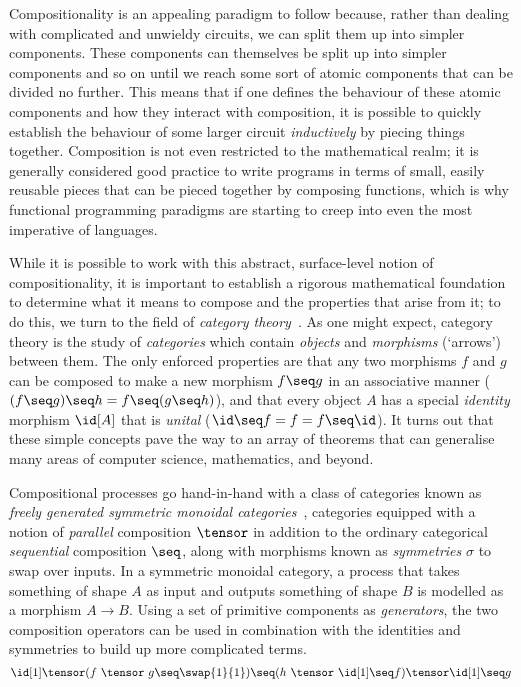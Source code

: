 Compositionality is an appealing paradigm to follow because, rather than dealing
with complicated and unwieldy circuits, we can split them up into simpler
components.
These components can themselves be split up into simpler components and so on
until we reach some sort of atomic components that can be divided no further.
This means that if one defines the behaviour of these atomic components and
how they interact with composition, it is possible to quickly establish the
behaviour of some larger circuit \emph{inductively} by piecing things together.
Composition is not even restricted to the mathematical realm; it is generally
considered good practice to write programs in terms of small, easily reusable
pieces that can be pieced together by composing functions, which is why
functional programming paradigms are starting to creep into even the most
imperative of languages.

While it is possible to work with this abstract, surface-level notion of
compositionality, it is important to establish a rigorous mathematical
foundation to determine what it means to compose and the properties that
arise from it; to do this, we turn to the field of
\emph{category theory}~\cite{maclane1978categories}.
As one might expect, category theory is the study of \emph{categories} which
contain \emph{objects} and \emph{morphisms} (`arrows') between them.
The only enforced properties are that any two morphisms \(f\) and \(g\) can be
composed to make a new morphism \(f \seq g\) in an
associative manner (\((f \seq g) \seq h = f \seq (g \seq h)\)), and that every
object \(A\) has a special \emph{identity} morphism \(\id[A]\) that is
\emph{unital} (\(\id \seq f = f = f \seq \id\)).
It turns out that these simple concepts pave the way to an array of
theorems that can generalise many areas of computer science, mathematics, and
beyond.

Compositional processes go hand-in-hand with a class of categories known as
\emph{freely generated symmetric monoidal categories}~\cite{maclane1963natural},
categories equipped with a notion of \emph{parallel} composition \(\tensor\) in
addition to the ordinary categorical \emph{sequential} composition \(\seq\),
along with morphisms known as \emph{symmetries} \(\sigma\) to swap over inputs.
In a symmetric monoidal category, a process that takes something of shape \(A\)
as input and outputs something of shape \(B\) is modelled as a morphism
\(A \to B\).
Using a set of primitive components as \emph{generators}, the two composition
operators can be used in combination with the identities and symmetries to build
up more complicated terms.
\[
    \id[1]
    \tensor
    (f\ \tensor\ g
    \seq
    \swap{1}{1}
    )
    \seq
    (h\ \tensor\ \id[1] \seq f)
    \tensor
    \id[1]
    \seq
    g
\]

